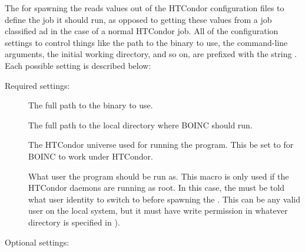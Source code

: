 The  for spawning the  reads
values out of the HTCondor configuration files to define the job it
should run, as opposed to getting these values from a job classified
ad in the case of a normal HTCondor job.
All of the configuration settings to control things like the path to
the  binary to use, the command-line arguments,
the initial working directory, and so on, are prefixed with the string
.
Each possible setting is described below: 

Required settings:

\begin{description}

\item[] \label{param:BoincExecutable} The
  full path to the  binary to use.

\item[] \label{param:BoincInitialDir} The
  full path to the local directory where BOINC should run.

\item[] \label{param:BoincUniverse} The HTCondor
  universe used for running the  program.
  This  be set to  for BOINC to work under
  HTCondor.

\item[] \label{param:BoincOwner} What user the
   program should be run as.
  This macro is only used if the HTCondor daemons are running as root.
  In this case, the  must be told what user identity
  to switch to before spawning the .
  This can be any valid user on the local system, but it must have
  write permission in whatever directory is specified in
  ).

\end{description}

Optional settings:

